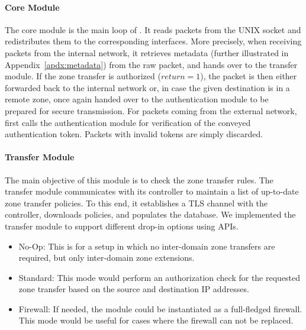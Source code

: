 
\paragraph{Core Module}
The core module is the main loop of \tp. It reads packets from the UNIX socket and
redistributes them to the corresponding interfaces. More precisely, when receiving packets
from the internal network, it retrieves metadata (further illustrated in 
Appendix~\ref{apdx:metadata}) from the raw packet, and hands over to the transfer module. 
If the zone transfer is authorized ($return=1$),
the packet is then either forwarded back to the internal network or, in case the given destination is in a remote zone, once again handed over to the authentication module to be prepared for secure transmission. 
For packets coming from the external network, \tp first calls the authentication module for
verification of the conveyed authentication token. Packets with invalid tokens are simply discarded.

\paragraph{Transfer Module}
The main objective of this module is to check the zone transfer rules. The transfer
module communicates with its controller to maintain a list of up-to-date zone transfer policies.
To this end, it establishes a TLS channel with the controller, downloads policies,
and populates the database. 
We implemented the transfer module to support different drop-in options using APIs.

\begin{itemize}
	\item No-Op: This is for a setup in which no inter-domain zone transfers are required, 
		  but only inter-domain zone extensions.
	\item Standard: This mode would perform an authorization check for the requested
	      zone transfer based on the source and destination IP addresses. 
	\item Firewall: If needed, the module could be instantiated as a full-fledged firewall.
	      This mode would be useful for cases where the firewall can not be replaced. 
\end{itemize}

